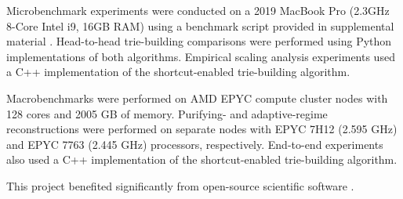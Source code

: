 Microbenchmark experiments were conducted on a 2019 MacBook Pro (2.3GHz 8-Core Intel i9, 16GB RAM) using a benchmark script provided in supplemental material \citep{supplemental}.
Head-to-head trie-building comparisons were performed using Python implementations of both algorithms.
Empirical scaling analysis experiments used a C++ implementation of the shortcut-enabled trie-building algorithm.

Macrobenchmarks were performed on AMD EPYC compute cluster nodes with 128 cores and 2005 GB of memory.
Purifying- and adaptive-regime reconstructions were performed on separate nodes with EPYC 7H12 (2.595 GHz) and EPYC 7763 (2.445 GHz) processors, respectively.
End-to-end experiments also used a C++ implementation of the shortcut-enabled trie-building algorithm.

This project benefited significantly from open-source scientific software \citep{2020SciPy-NMeth,harris2020array,reback2020pandas,mckinney2010data,waskom2021seaborn,hunter2007matplotlib,moreno2022hstrat,yang2025downstream}.

